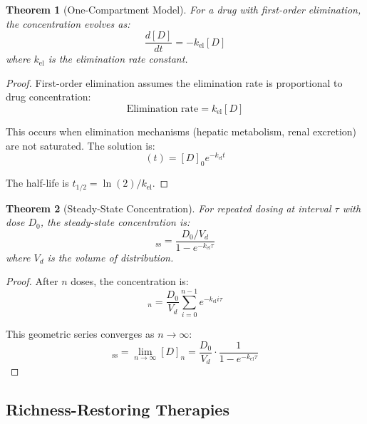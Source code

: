 \documentclass[11pt,twocolumn,a4paper]{article}
\newtheorem{theorem}{Theorem}[section]
\theoremstyle{definition}
\theoremstyle{remark}
\begin{document}
\begin{theorem}[One-Compartment Model]
\label{thm:one_compartment}
For a drug with first-order elimination, the concentration evolves as:
\begin{equation}
\frac{d[D]}{dt} = -k_{\mathrm{el}} [D]
\label{eq:one_compartment}
\end{equation}
where $k_{\mathrm{el}}$ is the elimination rate constant.
\end{theorem}

\begin{proof}
First-order elimination assumes the elimination rate is proportional to drug concentration:
\begin{equation}
\text{Elimination rate} = k_{\mathrm{el}} [D]
\end{equation}

This occurs when elimination mechanisms (hepatic metabolism, renal excretion) are not saturated. The solution is:
\begin{equation}
[D](t) = [D]_0 e^{-k_{\mathrm{el}} t}
\label{eq:exponential_decay}
\end{equation}

The half-life is $t_{1/2} = \ln(2)/k_{\mathrm{el}}$.
\end{proof}

\begin{theorem}[Steady-State Concentration]
\label{thm:steady_state}
For repeated dosing at interval $\tau$ with dose $D_0$, the steady-state concentration is:
\begin{equation}
[D]_{\mathrm{ss}} = \frac{D_0/V_d}{1 - e^{-k_{\mathrm{el}}\tau}}
\label{eq:steady_state}
\end{equation}
where $V_d$ is the volume of distribution.
\end{theorem}

\begin{proof}
After $n$ doses, the concentration is:
\begin{equation}
[D]_n = \frac{D_0}{V_d} \sum_{i=0}^{n-1} e^{-k_{\mathrm{el}} i\tau}
\end{equation}

This geometric series converges as $n \to \infty$:
\begin{equation}
[D]_{\mathrm{ss}} = \lim_{n\to\infty} [D]_n = \frac{D_0}{V_d} \cdot \frac{1}{1 - e^{-k_{\mathrm{el}}\tau}}
\end{equation}
\end{proof}



\subsection{Richness-Restoring Therapies}
\end{document}
